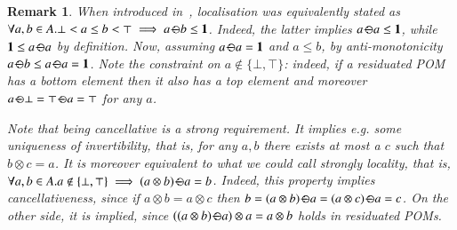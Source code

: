 \documentclass[preprint,12pt]{elsarticle}
\newtheorem{remark}{Remark}
\def\1{{\mathbf 1}}
\def\1{{\mathbf 1}}
\def\odiv{\, {\ominus\hspace{-7.7pt} \div} \,}
\begin{document}
\begin{remark}
	When introduced in~\cite[Def.~2.4]{ipl17}, localisation was equivalently stated as 
	$\forall a, b \in A. \bot < a \leq b<\top \implies a \odiv b \leq \1$.
	Indeed, the latter implies $a \odiv a \leq \1$, while  $\1 \leq a \odiv a$
	by definition. Now, assuming $a \odiv a = \1$ and $a \leq b$, 
	by anti-monotonicity $a \odiv b \leq a \odiv a = \1$.
	Note the constraint on $a \not \in \{\bot,\top\}$: indeed, if a residuated POM 
	has a bottom element then it also has a top element and moreover 
	$a \odiv \bot = \top \odiv a = \top$ for any  $a$.
	
	Note that being cancellative is a strong requirement. It implies e.g. 
	some uniqueness of invertibility, that is, for any $a, b$ there exists 
	at most a $c$ such that $b\otimes c = a$.
	It is moreover equivalent to what we could call strongly locality,
	that is, $\forall a, b \in A. a \not \in \{\bot,\top\} \implies (a \otimes b) \odiv a = b$. 
	Indeed, this property implies cancellativeness, since if $a \otimes b = a \otimes c$ 
	then $b = (a \otimes b) \odiv a = (a \otimes c) \odiv a = c$. On the other side,
	it is implied, since 
	$((a \otimes b) \odiv a)\otimes a = a \otimes b$ holds in residuated POMs.
\end{remark}
\end{document}
